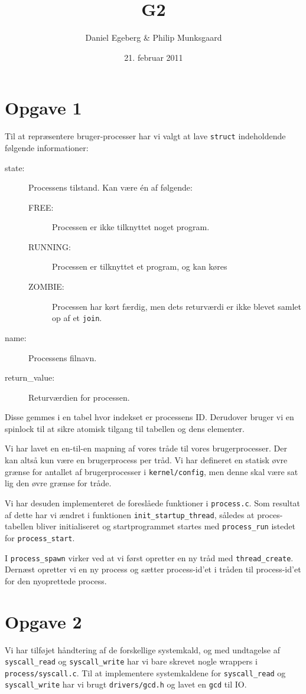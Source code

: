 \documentclass [10pt,a4paper]{article}
\title{G2}
\author{Daniel Egeberg \& Philip Munksgaard}
\date{21. februar 2011}
\begin{document}
\maketitle

\section*{Opgave 1} %

Til at repræsentere bruger-processer har vi valgt at lave \verb+struct+
indeholdende følgende informationer:

\begin{description}
    \item[state:] Processens tilstand. Kan være én af følgende:
        \begin{description}
            \item[FREE:] Processen er ikke tilknyttet noget program.
            \item[RUNNING:] Processen er tilknyttet et program, og kan køres
            \item[ZOMBIE:] Processen har kørt færdig, men dets returværdi er
                ikke blevet samlet op af et \verb+join+.
        \end{description}
    \item[name:] Processens filnavn.
    \item[return\_value:] Returværdien for processen.
\end{description}

Disse gemmes i en tabel hvor indekset er processens ID. Derudover
bruger vi en spinlock til at sikre atomisk tilgang til tabellen og
dens elementer.

Vi har lavet en en-til-en mapning af vores tråde til vores
brugerprocesser. Der kan altså kun være en brugerprocess per tråd. Vi
har defineret en statisk øvre grænse for antallet af brugerprocesser i
\verb+kernel/config+, men denne skal være sat lig den øvre grænse
for tråde.

Vi har desuden implementeret de foreslåede funktioner i
\verb+process.c+. Som resultat af dette har vi ændret i funktionen
\verb+init_startup_thread+, således at proces-tabellen bliver
initialiseret og startprogrammet startes med \verb+process_run+
istedet for \verb+process_start+.

I \verb+process_spawn+ virker ved at vi først opretter en ny tråd med
\verb+thread_create+. Dernæst opretter vi en ny process og sætter
process-id'et i tråden til process-id'et for den nyoprettede process.


\section*{Opgave 2} %

Vi har tilføjet håndtering af de forskellige systemkald, og med
undtagelse af \verb+syscall_read+ og \verb+syscall_write+ har vi bare
skrevet nogle wrappers i \verb+process/syscall.c+. Til at implementere
systemkaldene for \verb+syscall_read+ og \verb+syscall_write+ har vi brugt
\verb+drivers/gcd.h+ og lavet en \verb+gcd+ til IO.

\end{document}
